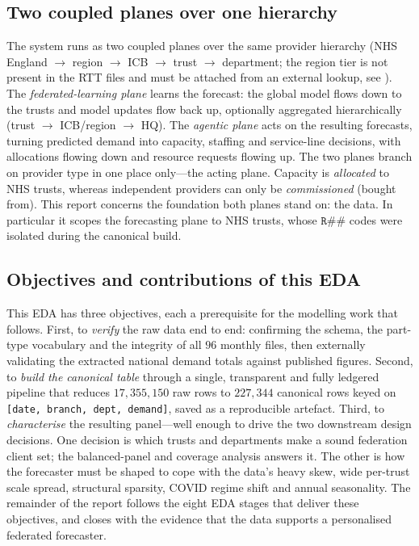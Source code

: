 \documentclass[11pt,a4paper]{article}
\begin{document}
\subsection{Two coupled planes over one hierarchy}
The system runs as two coupled planes over the same provider hierarchy (NHS England $\rightarrow$ region $\rightarrow$ ICB $\rightarrow$ trust $\rightarrow$ department; the region tier is not present in the RTT files and must be attached from an external lookup, see ). The \emph{federated-learning plane} learns the forecast: the global model flows down to the trusts and model updates flow back up, optionally aggregated hierarchically (trust $\rightarrow$ ICB/region $\rightarrow$ HQ). The \emph{agentic plane} acts on the resulting forecasts, turning predicted demand into capacity, staffing and service-line decisions, with allocations flowing down and resource requests flowing up. The two planes branch on provider type in one place only---the acting plane. Capacity is \emph{allocated} to NHS trusts, whereas independent providers can only be \emph{commissioned} (bought from). This report concerns the foundation both planes stand on: the data. In particular it scopes the forecasting plane to NHS trusts, whose $\texttt{R\#\#}$ codes were isolated during the canonical build.

\subsection{Objectives and contributions of this EDA}
This EDA has three objectives, each a prerequisite for the modelling work that follows. First, to \emph{verify} the raw data end to end: confirming the schema, the part-type vocabulary and the integrity of all $96$ monthly files, then externally validating the extracted national demand totals against published figures. Second, to \emph{build the canonical table} through a single, transparent and fully ledgered pipeline that reduces $17{,}355{,}150$ raw rows to $227{,}344$ canonical rows keyed on \texttt{[date, branch, dept, demand]}, saved as a reproducible artefact. Third, to \emph{characterise} the resulting panel---well enough to drive the two downstream design decisions. One decision is which trusts and departments make a sound federation client set; the balanced-panel and coverage analysis answers it. The other is how the forecaster must be shaped to cope with the data's heavy skew, wide per-trust scale spread, structural sparsity, COVID regime shift and annual seasonality. The remainder of the report follows the eight EDA stages that deliver these objectives, and closes with the evidence that the data supports a personalised federated forecaster.
\end{document}
